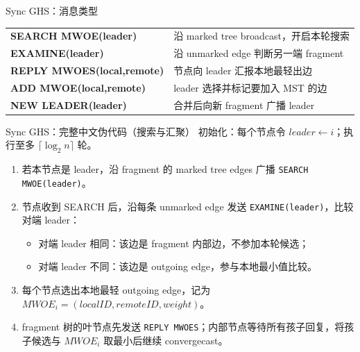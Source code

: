 \documentclass[UTF8,fontset=none,aspectratio=169,10pt]{beamer}
\begin{document}
{\begin{frame}{Sync GHS：消息类型}
\scriptsize
\begin{tabularx}{\linewidth}{>{\ttfamily\bfseries}p{3.9cm}X}
\toprule
SEARCH MWOE(leader) & 沿 marked tree broadcast，开启本轮搜索 \\
EXAMINE(leader) & 沿 unmarked edge 判断另一端 fragment \\
REPLY MWOES(local,remote) & 节点向 leader 汇报本地最轻出边 \\
ADD MWOE(local,remote) & leader 选择并标记要加入 MST 的边 \\
NEW LEADER(leader) & 合并后向新 fragment 广播 leader \\
\bottomrule
\end{tabularx}
\normalsize
\end{frame}

\begin{frame}{Sync GHS：完整中文伪代码（搜索与汇聚）}
\scriptsize
初始化：每个节点令 $leader\leftarrow i$；执行至多 $\lceil\log_2 n\rceil$ 轮。
\begin{enumerate}
  \item 若本节点是 leader，沿 fragment 的 marked tree edges 广播 \texttt{SEARCH MWOE(leader)}。
  \item 节点收到 SEARCH 后，沿每条 unmarked edge 发送 \texttt{EXAMINE(leader)}，比较对端 leader：
  \begin{itemize}\scriptsize
    \item 对端 leader 相同：该边是 fragment 内部边，不参加本轮候选；
    \item 对端 leader 不同：该边是 outgoing edge，参与本地最小值比较。
  \end{itemize}
  \item 每个节点选出本地最轻 outgoing edge，记为 $MWOE_i=(localID,remoteID,weight)$。
  \item fragment 树的叶节点先发送 \texttt{REPLY MWOES}；内部节点等待所有孩子回复，将孩子候选与 $MWOE_i$ 取最小后继续 convergecast。
\end{enumerate}
\normalsize
\vfill
{}
\end{frame}

}
\end{document}
